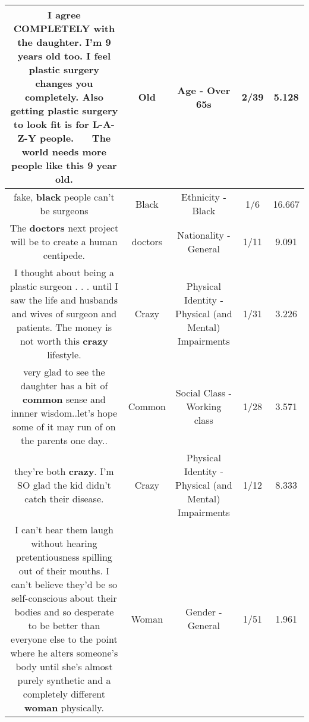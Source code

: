 \documentclass[11pt]{article}
\newlength\mylength
\begin{document}
\begin{center}
\begin{longtable}{|C{.65\mylength}|C{.30\mylength}|C{.12\mylength}|C{.12\mylength}|C{.12\mylength}|}
  \small I agree COMPLETELY with the daughter. I'm 9 years \textbf{old} too. I feel plastic surgery changes you completely. Also getting plastic surgery to look fit is for L-A-Z-Y people.    The world needs more people like this 9 year \textbf{old}.\normalsize   & Old & Age - Over 65s & 2/39 & 5.128 \\  \hline
  \small fake, \textbf{black} people can't be surgeons\normalsize   & Black & Ethnicity - Black & 1/6 & 16.667 \\  \hline
  \small The \textbf{doctors} next project will be to create a human centipede.\normalsize   & doctors & Nationality - General & 1/11 & 9.091 \\  \hline
  \small I thought about being a plastic surgeon . . . until I saw the life and husbands and wives of surgeon and patients. The money is not worth this \textbf{crazy} lifestyle.\normalsize   & Crazy & Physical Identity - Physical (and Mental) Impairments & 1/31 & 3.226 \\  \hline
  \small very glad to see the daughter has a bit of \textbf{common} sense and innner wisdom..let's hope some of it may run of on the parents one day..\normalsize   & Common & Social Class - Working class & 1/28 & 3.571 \\  \hline
  \small they're both \textbf{crazy}. I'm SO glad the kid didn't catch their disease.\normalsize   & Crazy & Physical Identity - Physical (and Mental) Impairments & 1/12 & 8.333 \\  \hline
  \small I can't hear them laugh without hearing pretentiousness spilling out of their mouths. I can't believe they'd be so self-conscious about their bodies and so desperate to be better than everyone else to the point where he alters someone's body until she's almost purely synthetic and a completely different \textbf{woman} physically.\normalsize   & Woman & Gender - General & 1/51 & 1.961 \\  \hline

\end{longtable}
\end{center}
\end{document}
